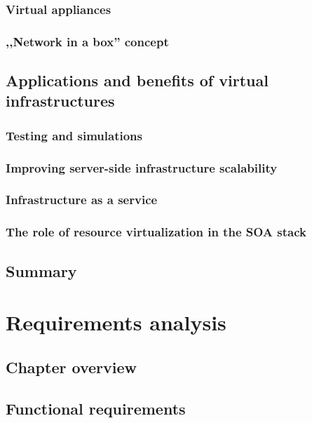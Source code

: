 \documentclass[11pt]{book}
\begin{document}
      \subsection{Virtual appliances}

      \subsection{,,Network in a box'' concept}


    \section{Applications and benefits of virtual infrastructures}

      \subsection{Testing and simulations}

      \subsection{Improving server-side infrastructure scalability}

      \subsection{Infrastructure as a service}

      \subsection{The role of resource virtualization in the SOA stack}


    \section*{Summary}


  \chapter{Requirements analysis}
    
    \section*{Chapter overview}

    \section{Functional requirements}
\end{document}
